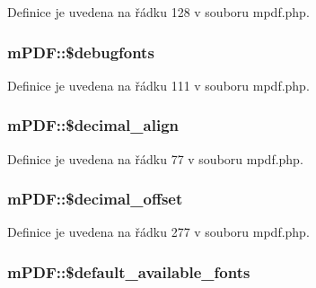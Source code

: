 Definice je uvedena na řádku 128 v souboru mpdf.\-php.

\hypertarget{classm_p_d_f_ac55acdeb9ee7e6a7d74193fbd04365f2}{
\subsubsection[{\$debugfonts}]{\setlength{\rightskip}{0pt plus 5cm}m\-P\-D\-F\-::\$debugfonts}}\label{classm_p_d_f_ac55acdeb9ee7e6a7d74193fbd04365f2}


Definice je uvedena na řádku 111 v souboru mpdf.\-php.

\hypertarget{classm_p_d_f_a6c49d58f42d4b66f6e4b2d0bb4d7aad7}{
\subsubsection[{\$decimal\-\_\-align}]{\setlength{\rightskip}{0pt plus 5cm}m\-P\-D\-F\-::\$decimal\-\_\-align}}\label{classm_p_d_f_a6c49d58f42d4b66f6e4b2d0bb4d7aad7}


Definice je uvedena na řádku 77 v souboru mpdf.\-php.

\hypertarget{classm_p_d_f_a3277470c5f74feea4f2d38835a19b446}{
\subsubsection[{\$decimal\-\_\-offset}]{\setlength{\rightskip}{0pt plus 5cm}m\-P\-D\-F\-::\$decimal\-\_\-offset}}\label{classm_p_d_f_a3277470c5f74feea4f2d38835a19b446}


Definice je uvedena na řádku 277 v souboru mpdf.\-php.

\hypertarget{classm_p_d_f_a68af73bb914639777daf3fd42bd8ab9e}{
\subsubsection[{\$default\-\_\-available\-\_\-fonts}]{\setlength{\rightskip}{0pt plus 5cm}m\-P\-D\-F\-::\$default\-\_\-available\-\_\-fonts}}\label{classm_p_d_f_a68af73bb914639777daf3fd42bd8ab9e}



